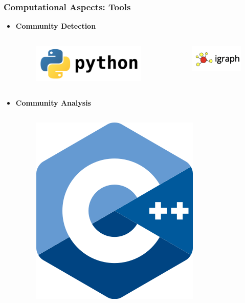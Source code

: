 \documentclass{beamer}
\begin{document}
\begin{frame}
\frametitle{Computational Aspects: Tools}
\begin{itemize}
	\item \textbf{Community Detection}
	\begin{columns} 
		\begin{column}{0.5\textwidth}
		\begin{figure}
		\includegraphics[width=0.6\linewidth]{figures/python1}
		\end{figure}
		\end{column}
		\begin{column}{0.5\textwidth}
		\begin{figure}
		\includegraphics[width=0.6\linewidth]{figures/igraph}
		\end{figure}
		\end{column}
	\end{columns}
	\item \textbf{Community Analysis}
		\begin{columns} 
			\begin{column}{0.3\textwidth}
				\begin{figure}
				\includegraphics[width=0.3\linewidth]{figures/cpiupiu}
				\end{figure}
			\end{column}
			\begin{column}{0.3\textwidth}

\end{column}
\end{columns}
\end{itemize}
\end{frame}
\end{document}
